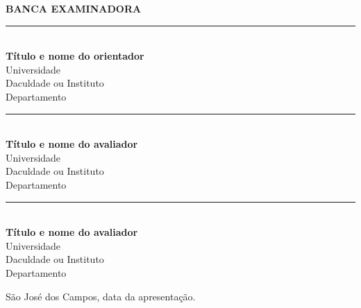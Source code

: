 %


\begin{folhadeaprovacao}

\begin{center}
{\large{\textbf{BANCA EXAMINADORA}}}


\begin{normalsize}

\rule{12cm}{1pt} \\
\textbf{Título e nome do orientador} \\
Universidade \\
Daculdade ou Instituto \\
Departamento \\

\vspace{4cm}

\rule{12cm}{1pt} \\
\textbf{Título e nome do avaliador} \\
Universidade \\
Daculdade ou Instituto \\
Departamento \\

\vspace{4cm}

\rule{12cm}{1pt} \\
\textbf{Título e nome do avaliador} \\
Universidade \\
Daculdade ou Instituto \\
Departamento \\

\end{normalsize}

\end{center}  

\vspace{4.25cm}

\begin{flushright}
São José dos Campos, data da apresentação.
\end{flushright}
  
\end{folhadeaprovacao}
